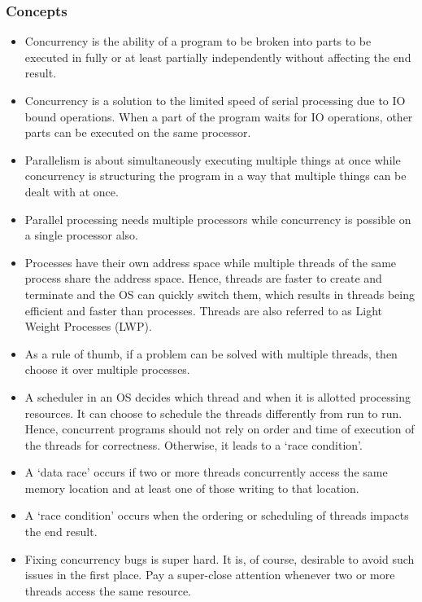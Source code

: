 \documentclass{scrartcl}
\begin{document}
\subsubsection{Concepts}

\begin{itemize}
    \item Concurrency is the ability of a program to be broken into parts to be executed in fully or at least partially independently without affecting the end result.
    \item Concurrency is a solution to the limited speed of serial processing due to IO bound operations. When a part of the program waits for IO operations, other parts can be executed on the same processor.
    \item Parallelism is about simultaneously executing multiple things at once while concurrency is structuring the program in a way that multiple things can be dealt with at once. 
    \item Parallel processing needs multiple processors while concurrency is possible on a single processor also.
    \item Processes have their own address space while multiple threads of the same process share the address space. Hence, threads are faster to create and terminate and the OS can quickly switch them, which results in threads being efficient and faster than processes. Threads are also referred to as Light Weight Processes (LWP).
    \item As a rule of thumb, if a problem can be solved with multiple threads, then choose it over multiple processes.
    \item A scheduler in an OS decides which thread and when it is allotted processing resources. It can choose to schedule the threads differently from run to run. Hence, concurrent programs should not rely on order and time of execution of the threads for correctness. Otherwise, it leads to a `race condition'.
    \item A `data race' occurs if two or more threads concurrently access the same memory location and at least one of those writing to that location. 
    \item A `race condition' occurs when the ordering or scheduling of threads impacts the end result.
    \item Fixing concurrency bugs is super hard. It is, of course, desirable to avoid such issues in the first place. Pay a super-close attention whenever two or more threads access the same resource.
\end{itemize}
\end{document}
